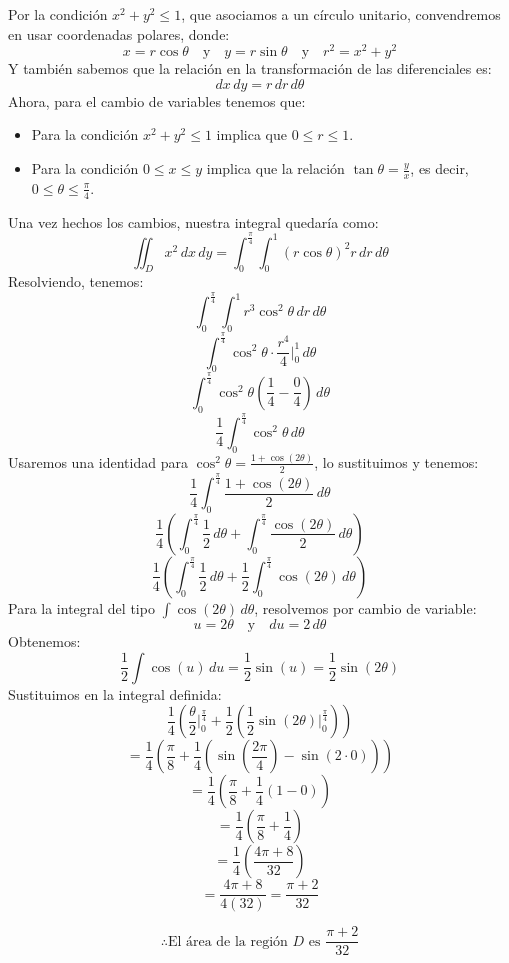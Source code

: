 Por la condición \( x^2 + y^2 \leq 1 \), que asociamos a un círculo unitario, convendremos en usar coordenadas polares, donde:
\[
x = r \cos \theta \quad \text{y} \quad y = r \sin \theta \quad \text{y} \quad r^2 = x^2 + y^2
\]
Y también sabemos que la relación en la transformación de las diferenciales es:
\[
dx \, dy = r \, dr \, d\theta
\]
Ahora, para el cambio de variables tenemos que:
\begin{itemize}
    \item Para la condición \( x^2 + y^2 \leq 1 \) implica que \( 0 \leq r \leq 1 \).
    \item Para la condición \( 0 \leq x \leq y \) implica que la relación \( \tan \theta = \frac{y}{x} \), es decir, \( 0 \leq \theta \leq \frac{\pi}{4} \).
\end{itemize}

Una vez hechos los cambios, nuestra integral quedaría como:
\[
\iint_D x^2 \, dx \, dy = \int_0^{\frac{\pi}{4}} \int_0^1 \left( r \cos \theta \right)^2 r \, dr \, d\theta
\]
Resolviendo, tenemos:
\[
\int_0^{\frac{\pi}{4}} \int_0^1 r^3 \cos^2 \theta \, dr \, d\theta
\]
\[
\int_0^{\frac{\pi}{4}} \cos^2 \theta \cdot \frac{r^4}{4} \bigg|_0^1 \, d\theta
\]
\[
\int_0^{\frac{\pi}{4}} \cos^2 \theta \left( \frac{1}{4} - \frac{0}{4} \right) \, d\theta
\]
\[
\frac{1}{4} \int_0^{\frac{\pi}{4}} \cos^2 \theta \, d\theta
\]
Usaremos una identidad para \( \cos^2 \theta = \frac{1 + \cos(2\theta)}{2} \), lo sustituimos y tenemos:
\[
\frac{1}{4} \int_0^{\frac{\pi}{4}} \frac{1 + \cos(2\theta)}{2} \, d\theta
\]
\[
\frac{1}{4} \left( \int_0^{\frac{\pi}{4}} \frac{1}{2} \, d\theta + \int_0^{\frac{\pi}{4}} \frac{\cos(2\theta)}{2} \, d\theta \right)
\]
\[
\frac{1}{4} \left( \int_0^{\frac{\pi}{4}} \frac{1}{2} \, d\theta + \frac{1}{2} \int_0^{\frac{\pi}{4}} \cos(2\theta) \, d\theta \right)
\]
Para la integral del tipo \( \int \cos(2\theta) \, d\theta \), resolvemos por cambio de variable:
\[
u = 2\theta \quad \text{y} \quad du = 2 \, d\theta
\]
Obtenemos:
\[
\frac{1}{2} \int \cos(u) \, du = \frac{1}{2} \sin(u) = \frac{1}{2} \sin(2\theta)
\]
Sustituimos en la integral definida:
\[
\frac{1}{4} \left( \frac{\theta}{2} \bigg|_0^{\frac{\pi}{4}} + \frac{1}{2} \left( \frac{1}{2} \sin(2\theta) \bigg|_0^{\frac{\pi}{4}} \right) \right)
\]
\[
= \frac{1}{4} \left( \frac{\pi}{8} + \frac{1}{4} \left( \sin\left(\frac{2\pi}{4}\right) - \sin(2 \cdot 0) \right) \right)
\]
\[
= \frac{1}{4} \left( \frac{\pi}{8} + \frac{1}{4} (1 - 0) \right)
\]
\[
= \frac{1}{4} \left( \frac{\pi}{8} + \frac{1}{4} \right)
\]
\[
= \frac{1}{4} \left( \frac{4\pi + 8}{32} \right)
\]
\[
= \frac{4\pi + 8}{4(32)} = \frac{\pi + 2}{32}
\]

\[
\therefore \text{El área de la región } D \text{ es } \frac{\pi + 2}{32}
\]
